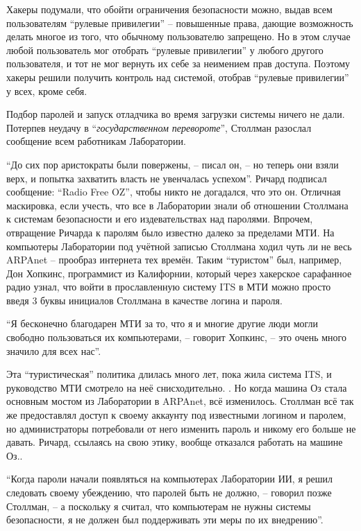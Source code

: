 Хакеры подумали, что обойти ограничения безопасности можно, выдав всем пользователям \enquote{рулевые привилегии} -- повышенные права, дающие возможность делать многое из того, что обычному пользователю запрещено. Но в этом случае любой пользователь мог отобрать \enquote{рулевые привилегии} у любого другого пользователя, и тот не мог вернуть их себе за неимением прав доступа. Поэтому хакеры решили получить контроль над системой, отобрав \enquote{рулевые привилегии} у всех, кроме себя.

Подбор паролей и запуск отладчика во время загрузки системы ничего не дали. Потерпев неудачу в \enquote{\textit{государственном перевороте}}, Столлман разослал сообщение всем работникам Лаборатории. 

\enquote{До сих пор аристократы были повержены, -- писал он, -- но теперь они взяли верх, и попытка захватить власть не увенчалась успехом}. Ричард подписал сообщение: \enquote{Radio Free OZ}, чтобы никто не догадался, что это он. Отличная маскировка, если учесть, что все в Лаборатории знали об отношении Столлмана к системам безопасности и его издевательствах над паролями. Впрочем, отвращение Ричарда к паролям было известно далеко за пределами МТИ. На компьютеры Лаборатории под учётной записью Столлмана ходил чуть ли не весь ARPAnet -- прообраз интернета тех времён. Таким \enquote{туристом} был, например, Дон Хопкинс, программист из Калифорнии, который через хакерское сарафанное радио узнал, что войти в прославленную систему ITS в МТИ можно просто введя 3 буквы инициалов Столлмана в качестве логина и пароля.

\enquote{Я бесконечно благодарен МТИ за то, что я и многие другие люди могли свободно пользоваться их компьютерами, -- говорит Хопкинс, -- это очень много значило для всех нас}.

Эта \enquote{туристическая} политика длилась много лет, пока жила система ITS, и руководство МТИ смотрело на неё снисходительно. . Но когда машина Оз стала основным мостом из Лаборатории в ARPAnet, всё изменилось. Столлман всё так же предоставлял доступ к своему аккаунту под известными логином и паролем, но администраторы потребовали от него изменить пароль и никому его больше не давать. Ричард, ссылаясь на свою этику, вообще отказался работать на машине Оз..

\enquote{Когда пароли начали появляться на компьютерах Лаборатории ИИ, я решил следовать своему убеждению, что паролей быть не должно, -- говорил позже Столлман, -- а поскольку я считал, что компьютерам не нужны системы безопасности, я не должен был поддерживать эти меры по их внедрению}.

